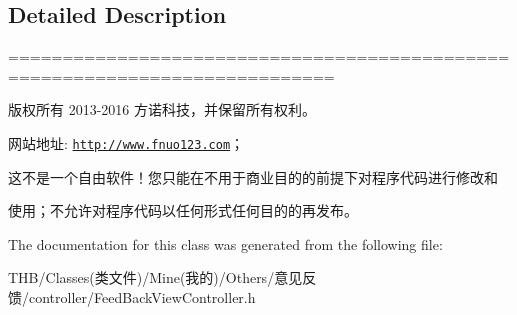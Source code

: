 \subsection{Detailed Description}
============================================================================

版权所有 2013-\/2016 方诺科技，并保留所有权利。

网站地址\+: \href{http://www.fnuo123.com}{\tt http\+://www.\+fnuo123.\+com}； 



这不是一个自由软件！您只能在不用于商业目的的前提下对程序代码进行修改和

使用；不允许对程序代码以任何形式任何目的的再发布。 

 

The documentation for this class was generated from the following file\+:\begin{DoxyCompactItemize}
\item 
T\+H\+B/\+Classes(类文件)/\+Mine(我的)/\+Others/意见反馈/controller/Feed\+Back\+View\+Controller.\+h\end{DoxyCompactItemize}
